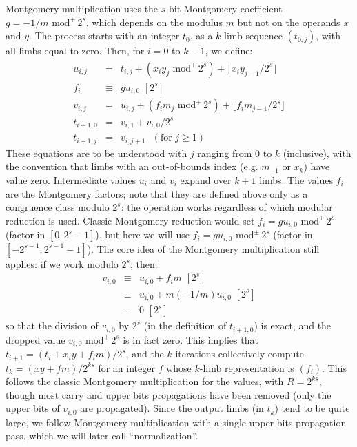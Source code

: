 \documentclass{llncs}
\newcommand{\umod}[2]{#1 \,\,\text{mod}^{+}\, #2}
\newcommand{\smod}[2]{#1 \,\,\text{mod}^{\pm}\, #2}
\begin{document}
Montgomery multiplication uses the $s$-bit Montgomery coefficient
$g = \umod{-1/m}{2^s}$, which depends on the modulus $m$ but not on the
operands $x$ and $y$. The process starts with an integer $t_0$, as a
$k$-limb sequence $(t_{0,j})$, with all limbs equal to zero. Then, for
$i = 0$ to $k-1$, we define:
\begin{eqnarray*}
    u_{i,j} &=& t_{i,j} + (\umod{x_i y_j}{2^s}) + \lfloor x_i y_{j-1} / 2^s \rfloor \\
    f_i &\equiv& g u_{i,0} \,\,[2^s] \\
    v_{i,j} &=& u_{i,j} + (\umod{f_i m_j}{2^s}) + \lfloor f_i m_{j-1} / 2^s \rfloor \\
    t_{i+1,0} &=& v_{i,1} + v_{i,0}/2^s \\
    t_{i+1,j} &=& v_{i,j+1} \ \ \ (\text{for\ }j\geq 1)
\end{eqnarray*}
These equations are to be understood with $j$ ranging from $0$ to $k$
(inclusive), with the convention that limbs with an out-of-bounds index
(e.g. $m_{-1}$ or $x_k$) have value zero. Intermediate values $u_i$ and
$v_i$ expand over $k+1$ limbs. The values $f_i$ are the Montgomery
factors; note that they are defined above only as a congruence class
modulo $2^s$: the operation works regardless of which modular reduction
is used. Classic Montgomery reduction would set $f_i = \umod{g
u_{i,0}}{2^s}$ (factor in $[0, 2^s - 1]$), but here we will use $f_i =
\smod{g u_{i,0}}{2^s}$ (factor in $[-2^{s-1}, 2^{s-1} - 1]$). The core
idea of the Montgomery multiplication still applies: if we work modulo
$2^s$, then:
\begin{eqnarray*}
    v_{i,0} &\equiv& u_{i,0} + f_i m \,\,[2^s] \\
            &\equiv& u_{i,0} + m (-1/m) u_{i,0} \,\,[2^s] \\
            &\equiv& 0 \,\,[2^s]
\end{eqnarray*}
so that the division of $v_{i,0}$ by $2^s$ (in the definition of
$t_{i+1,0}$) is exact, and the dropped value $\umod{v_{i,0}}{2^s}$ is in
fact zero. This implies that $t_{i+1} = (t_i + x_i y + f_i m)/2^s$, and
the $k$ iterations collectively compute $t_k = (xy + fm)/2^{ks}$ for an
integer $f$ whose $k$-limb representation is $(f_i)$. This follows the
classic Montgomery multiplication for the values, with $R = 2^{ks}$,
though most carry and upper bits propagations have been removed (only
the upper bits of $v_{i,0}$ are propagated). Since the output limbs (in
$t_k$) tend to be quite large, we follow Montgomery multiplication with
a single upper bits propagation pass, which we will later call
``normalization''.
\end{document}
